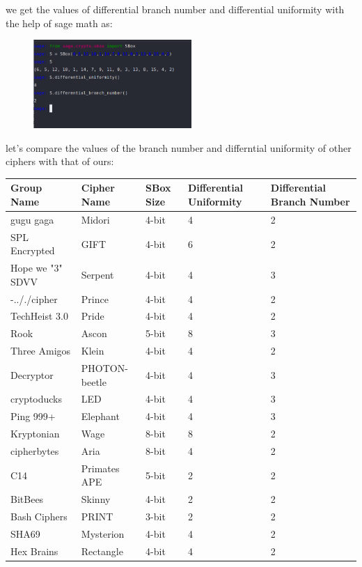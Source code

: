 \documentclass[journal=tosc,preprint]{iacrtrans}
\begin{document}
we get the values of differential branch number and differential uniformity with the help of sage math as:


\begin{figure}[htp]
    \centering
    \includegraphics[width=6cm]{img_3.png}
\end{figure}



let's compare the values of the branch number and differntial uniformity of other ciphers with that of ours:

\begin{table}[!ht]
    \centering
    \tiny
    \begin{tabular}{|l|l|l|l|l|}
    \hline
        Group Name & Cipher Name & SBox Size  & Differential Uniformity & Differential Branch Number \\ \hline
        gugu gaga & Midori & 4-bit  & 4 & 2 \\ \hline
        SPL Encrypted  & GIFT & 4-bit & 6 & 2 \\ \hline
        Hope we "3" SDVV & Serpent & 4-bit & 4 & 3 \\ \hline
        -.././cipher  & Prince & 4-bit & 4 & 2 \\ \hline
        TechHeist 3.0 & Pride & 4-bit & 4 & 2 \\ \hline
        Rook & Ascon & 5-bit & 8 & 3 \\ \hline
        Three Amigos & Klein & 4-bit & 4 & 2 \\ \hline
        Decryptor & PHOTON-beetle & 4-bit & 4 & 3 \\ \hline
        cryptoducks & LED & 4-bit & 4 & 3 \\ \hline
        Ping 999+ & Elephant & 4-bit & 4 & 3 \\ \hline
        Kryptonian & Wage  & 8-bit & 8 & 2 \\ \hline
        cipherbytes & Aria & 8-bit & 4 & 2 \\ \hline
        C14 & Primates APE & 5-bit & 2 & 2 \\ \hline
        BitBees & Skinny & 4-bit & 2 & 2 \\ \hline
        Bash Ciphers & PRINT & 3-bit & 2 & 2 \\ \hline
        SHA69 & Mysterion  & 4-bit & 4 & 2 \\ \hline
        Hex Brains & Rectangle & 4-bit & 4 & 2 \\ \hline
    \end{tabular}
\end{table}
\end{document}
